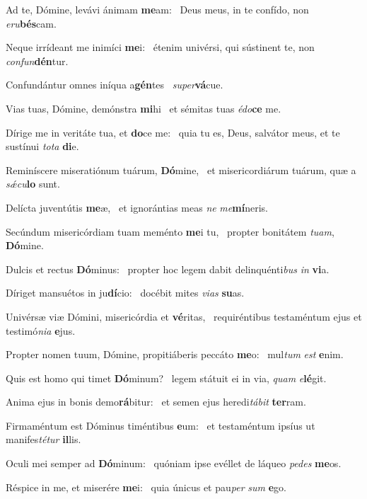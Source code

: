 \item Ad te, Dómine, levávi ánimam \textbf{me}am:~\psstar{} Deus meus, in te confído, non \textit{eru}\textbf{bés}cam.
\item Neque irrídeant me inimíci \textbf{me}i:~\psstar{} étenim univérsi, qui sústinent te, non \textit{confun}\textbf{dén}tur.
\item Confundántur omnes iníqua a\textbf{gén}tes~\psstar{} \textit{super}\textbf{vá}cue.
\item Vias tuas, Dómine, demónstra \textbf{mi}hi~\psstar{} et sémitas tuas \textit{édo}\textbf{ce} me.
\item Dírige me in veritáte tua, et \textbf{do}ce me:~\psstar{} quia tu es, Deus, salvátor meus, et te sustínui \textit{tota} \textbf{di}e.
\item Reminíscere miseratiónum tuárum, \textbf{Dó}mine,~\psstar{} et misericordiárum tuárum, quæ a \textit{sǽcu}\textbf{lo} sunt.
\item Delícta juventútis \textbf{me}æ,~\psstar{} et ignorántias meas \textit{ne} \textit{me}\textbf{mí}neris.
\item Secúndum misericórdiam tuam meménto \textbf{me}i tu,~\psstar{} propter bonitátem \textit{tuam}, \textbf{Dó}mine.
\item Dulcis et rectus \textbf{Dó}minus:~\psstar{} propter hoc legem dabit delinquénti\textit{bus} \textit{in} \textbf{vi}a.
\item Díriget mansuétos in ju\textbf{dí}cio:~\psstar{} docébit mites \textit{vias} \textbf{su}as.
\item Univérsæ viæ Dómini, misericórdia et \textbf{vé}ritas,~\psstar{} requiréntibus testaméntum ejus et testimó\textit{nia} \textbf{e}jus.
\item Propter nomen tuum, Dómine, propitiáberis peccáto \textbf{me}o:~\psstar{} mul\textit{tum} \textit{est} \textbf{e}nim.
\item Quis est homo qui timet \textbf{Dó}minum?~\psstar{} legem státuit ei in via, \textit{quam} \textit{e}\textbf{lé}git.
\item Anima ejus in bonis demo\textbf{rá}bitur:~\psstar{} et semen ejus heredi\textit{tábit} \textbf{ter}ram.
\item Firmaméntum est Dóminus timéntibus \textbf{e}um:~\psstar{} et testaméntum ipsíus ut manifes\textit{tétur} \textbf{il}lis.
\item Oculi mei semper ad \textbf{Dó}minum:~\psstar{} quóniam ipse evéllet de láqueo \textit{pedes} \textbf{me}os.
\item Réspice in me, et miserére \textbf{me}i:~\psstar{} quia únicus et pau\textit{per} \textit{sum} \textbf{e}go.
